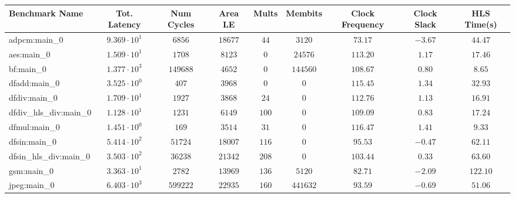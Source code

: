 \begin{tabular}{|l|c|c|c|c|c|c|c|c|}
\hline
Benchmark Name          & Tot. Latency           & Num Cycles & Area LE    & Mults   & Membits    & Clock Frequency & Clock Slack & HLS Time(s) \\
\hline
adpcm:main\_0           & $ 9.369 \cdot 10^{1} $ & $ 6856   $ & $ 18677  $ & $ 44  $ & $ 3120   $ & $ 73.17       $ & $ -3.67   $ & $ 44.47   $ \\
aes:main\_0             & $ 1.509 \cdot 10^{1} $ & $ 1708   $ & $ 8123   $ & $ 0   $ & $ 24576  $ & $ 113.20      $ & $ 1.17    $ & $ 17.46   $ \\
bf:main\_0              & $ 1.377 \cdot 10^{3} $ & $ 149688 $ & $ 4652   $ & $ 0   $ & $ 144560 $ & $ 108.67      $ & $ 0.80    $ & $ 8.65    $ \\
dfadd:main\_0           & $ 3.525 \cdot 10^{0} $ & $ 407    $ & $ 3968   $ & $ 0   $ & $ 0      $ & $ 115.45      $ & $ 1.34    $ & $ 32.93   $ \\
dfdiv:main\_0           & $ 1.709 \cdot 10^{1} $ & $ 1927   $ & $ 3868   $ & $ 24  $ & $ 0      $ & $ 112.76      $ & $ 1.13    $ & $ 16.91   $ \\
dfdiv\_hls\_div:main\_0 & $ 1.128 \cdot 10^{1} $ & $ 1231   $ & $ 6149   $ & $ 100 $ & $ 0      $ & $ 109.09      $ & $ 0.83    $ & $ 17.24   $ \\
dfmul:main\_0           & $ 1.451 \cdot 10^{0} $ & $ 169    $ & $ 3514   $ & $ 31  $ & $ 0      $ & $ 116.47      $ & $ 1.41    $ & $ 9.33    $ \\
dfsin:main\_0           & $ 5.414 \cdot 10^{2} $ & $ 51724  $ & $ 18007  $ & $ 116 $ & $ 0      $ & $ 95.53       $ & $ -0.47   $ & $ 62.11   $ \\
dfsin\_hls\_div:main\_0 & $ 3.503 \cdot 10^{2} $ & $ 36238  $ & $ 21342  $ & $ 208 $ & $ 0      $ & $ 103.44      $ & $ 0.33    $ & $ 63.60   $ \\
gsm:main\_0             & $ 3.363 \cdot 10^{1} $ & $ 2782   $ & $ 13969  $ & $ 136 $ & $ 5120   $ & $ 82.71       $ & $ -2.09   $ & $ 122.10  $ \\
jpeg:main\_0            & $ 6.403 \cdot 10^{3} $ & $ 599222 $ & $ 22935  $ & $ 160 $ & $ 441632 $ & $ 93.59       $ & $ -0.69   $ & $ 51.06   $ \\

\end{tabular}
